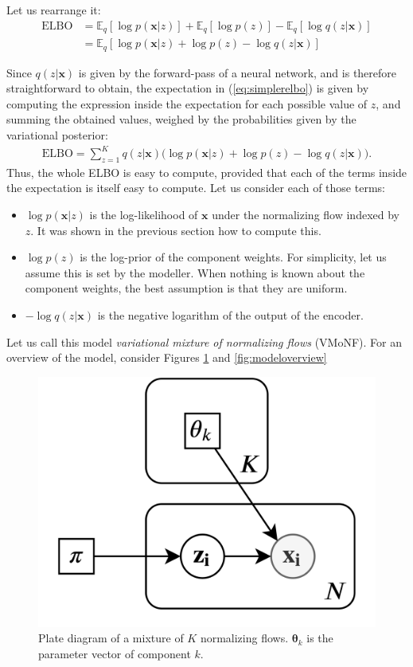 Let us rearrange it:
\begin{align}
    \text{ELBO} &= \mathbb{E}_q [\log p(\bm{x}|z)] + \mathbb{E}_q [\log p(z)] - \mathbb{E}_q [\log q(z|\bm{x})]
        \label{eq:threepartelbo} \\
    &= \mathbb{E}_q [\log p(\bm{x}|z) + \log p(z) - \log q(z|\bm{x})] \label{eq:simplerelbo}
\end{align}

Since $q(z|\bm{x})$ is given by the forward-pass of a neural network, and is therefore
straightforward to obtain, the expectation in (\ref{eq:simplerelbo}) is given by
computing the expression inside the expectation for each possible value of $z$,
and summing the obtained values, weighed by the probabilities given by the variational posterior:
\begin{align}
    \text{ELBO} = \sum_{z=1}^K q(z|\bm{x})\big(\log p(\bm{x}|z) + \log p(z) - \log q(z|\bm{x})\big).
\end{align}
Thus, the whole ELBO is easy to compute, provided that each of the terms inside
the expectation is itself easy to compute. Let us consider each of those terms:
\begin{itemize}
    \item $\log p(\bm{x}|z)$ is the log-likelihood of $\bm{x}$ under the normalizing
        flow indexed by $z$. It was shown in the previous section how to compute
        this.
    \item $\log p(z)$ is the log-prior of the component weights. For simplicity,
        let us assume this is set by the modeller. When nothing is known about
        the component weights, the best assumption is that they are uniform.
    \item $- \log q(z|\bm{x})$ is the negative logarithm of the output of the encoder.
\end{itemize}

Let us call this model \emph{variational mixture of normalizing flows} (VMoNF). For an overview of
the model, consider Figures \ref{fig:plate} and \ref{fig:modeloverview}

\begin{figure}[!htb]
  \centering
  \includegraphics[width=0.5\linewidth]{figures/plate_diagram.png}
  \caption{Plate diagram of a mixture of $K$ normalizing flows. $\bm\theta_k$ is the
    parameter vector of component $k$.}
  \label{fig:plate}
\end{figure}

